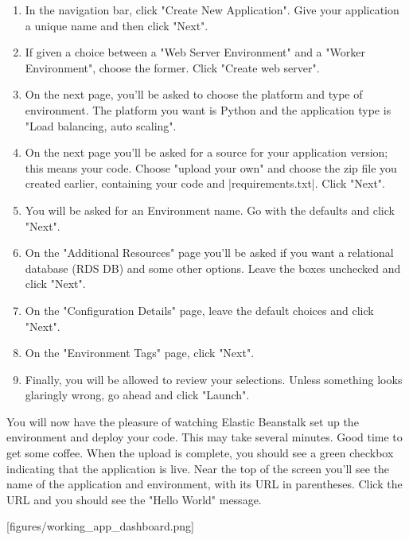 \documentclass[11pt]{book}
\begin{document}
\begin{enumerate}
    \item In the navigation bar, click "Create New Application".  Give your application a unique name and then click "Next".

    \item If given a choice between a "Web Server Environment" and a "Worker Environment", choose the former.  Click "Create web server".

    \item On the next page, you'll be asked to choose the platform and type of environment.  The platform you want is Python and the application type is "Load balancing, auto scaling".

    \item On the next page you'll be asked for a source for your application version; this means your code.  Choose "upload your own" and choose the zip file you created earlier, containing your code and |requirements.txt|.  Click "Next".

    \item You will be asked for an Environment name.  Go with the defaults and click "Next".

    \item On the "Additional Resources" page you'll be asked if you want a relational database (RDS DB) and some other options.  Leave the boxes unchecked and click "Next".

    \item On the "Configuration Details" page, leave the default choices and click "Next".

    \item On the "Environment Tags" page, click "Next".

    \item Finally, you will be allowed to review your selections.  Unless something looks glaringly wrong, go ahead and click "Launch".
\end{enumerate}

You will now have the pleasure of watching Elastic Beanstalk set up the environment and deploy your code.  This may take several minutes.  Good time to get some coffee.  When the upload is complete, you should see a green checkbox indicating that the application is live.  Near the top of the screen you'll see the name of the application and environment, with its URL in parentheses.  Click the URL and you should see the "Hello World" message.

[figures/working\_app\_dashboard.png]
\end{document}
